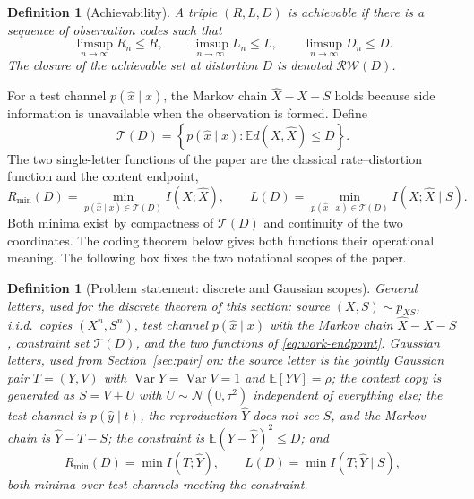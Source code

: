﻿\documentclass[11pt,onecolumn]{IEEEtran}
\newtheorem{definition}[theorem]{Definition}
\newcommand{\E}{\mathbb{E}}
\newcommand{\hX}{\widehat{X}}
\newcommand{\hY}{\widehat{Y}}
\newcommand{\RW}{\mathcal{R}\!\mathcal{W}}
\begin{document}
\begin{definition}[Achievability]\label{def:achievability}
A triple $(R,L,D)$ is achievable if there is a sequence of observation codes
such that
\begin{equation}
 \limsup_{n\to\infty}R_n\le R,\qquad
 \limsup_{n\to\infty}L_n\le L,\qquad
 \limsup_{n\to\infty}D_n\le D.
\end{equation}
The closure of the achievable set at distortion $D$ is denoted $\RW(D)$.
\end{definition}

For a test channel $p(\hat x\mid x)$, the Markov chain $\hX-X-S$ holds
because side information is unavailable when the observation is formed.
Define
\begin{equation}
 \mathcal T(D)
 =\left\{p(\hat x\mid x):\E d(X,\hX)\le D\right\}.
\end{equation}
The two single-letter functions of the paper are the classical
rate--distortion function and the content endpoint,
\begin{equation}
 R_{\min}(D)=\min_{p(\hat x\mid x)\in\mathcal T(D)}I(X;\hX),
 \qquad
 L(D)=\min_{p(\hat x\mid x)\in\mathcal T(D)}I(X;\hX\mid S).
 \label{eq:work-endpoint}
\end{equation}
Both minima exist by compactness of $\mathcal T(D)$ and continuity of the
two coordinates. The coding theorem below gives both functions their
operational meaning. The following box fixes the two notational scopes of
the paper.

\begin{definition}[Problem statement: discrete and Gaussian scopes]\label{def:problem}
\emph{General letters}, used for the discrete theorem of this section:
source $(X,S)\sim p_{XS}$, i.i.d.\ copies $(X^n,S^n)$, test channel
$p(\hat x\mid x)$ with the Markov chain $\hX-X-S$, constraint set
$\mathcal T(D)$, and the two functions of \eqref{eq:work-endpoint}.
\emph{Gaussian letters}, used from Section~\ref{sec:pair} on: the source
letter is the jointly Gaussian pair $T=(Y,V)$ with
$\operatorname{Var}Y=\operatorname{Var}V=1$ and $\E[YV]=\rho$; the context
copy is generated as $S=V+U$ with $U\sim\mathcal N(0,\tau^2)$ independent
of everything else; the test channel is $p(\hat y\mid t)$, the reproduction
$\hY$ does not see $S$, and the Markov chain is $\hY-T-S$; the constraint
is $\E(Y-\hY)^2\le D$; and
\[
R_{\min}(D)=\min I(T;\hY),
\qquad
L(D)=\min I(T;\hY\mid S),
\]
both minima over test channels meeting the constraint.
\end{definition}
\end{document}

